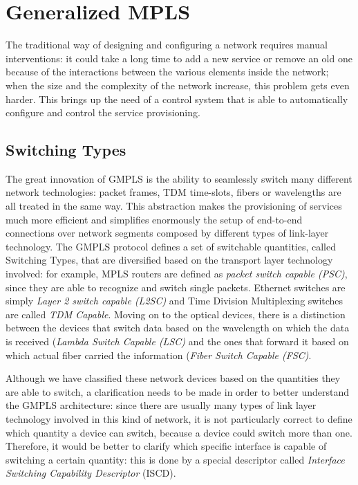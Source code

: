 \documentclass[10pt,a4paper]{report}
\begin{document}
\section{Generalized MPLS}

The traditional way of designing and configuring a network requires
manual interventions: it could take a long time to add a new service
or remove an old one because of the interactions between the various
elements inside the network; when the size and the complexity of the
network increase, this problem gets even harder. This brings up the
need of a control system that is able to automatically configure and
control the service provisioning.

\subsection{Switching Types}

The great innovation of GMPLS is the ability to seamlessly switch many
different network technologies: packet frames, TDM time-slots, fibers
or wavelengths are all treated in the same way. This abstraction makes
the provisioning of services much more efficient and simplifies
enormously the setup of end-to-end connections over network segments
composed by different types of link-layer technology. The GMPLS
protocol defines a set of switchable quantities, called Switching
Types, that are diversified based on the transport layer technology
involved: for example, MPLS routers are defined as \textit{packet
  switch capable (PSC)}, since they are able to recognize and switch
single packets. Ethernet switches are simply \textit{Layer 2 switch
  capable (L2SC)} and Time Division Multiplexing switches are called
\textit{TDM Capable}. Moving on to the optical devices, there is a
distinction between the devices that switch data based on the
wavelength on which the data is received (\textit{Lambda Switch
  Capable (LSC)} and the ones that forward it based on which actual
fiber carried the information (\textit{Fiber Switch Capable (FSC)}.

Although we have classified these network devices based on the
quantities they are able to switch, a clarification needs to be made
in order to better understand the GMPLS architecture: since there are
usually many types of link layer technology involved in this kind of
network, it is not particularly correct to define which quantity a
device can switch, because a device could switch more than
one. Therefore, it would be better to clarify which specific
interface is capable of switching a certain quantity: this is done by
a special descriptor called \textit{Interface Switching Capability
  Descriptor} (ISCD).
\end{document}
